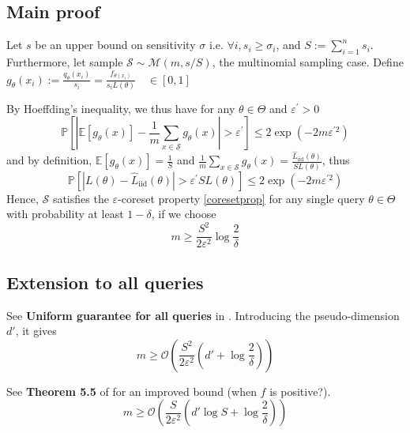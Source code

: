 \documentclass{article} %
\renewcommand{\epsilon}{\varepsilon}
\newcommand{\1}{\mathds{1}} %
\theoremstyle{definition} %
\begin{document}
\subsection{Main proof}
Let $s$ be an upper bound on sensitivity $\sigma$ i.e. $\forall i, s_i \geq \sigma_i$, and $S := \sum_{i=1}^n s_i$. Furthermore, let sample  $\mathcal S \sim \mathcal M(m, s/S)$, the multinomial sampling case. Define $g_\theta(x_i) := \frac{q_\theta(x_i)}{s_i} = \frac{f_{\theta(x_i)}}{s_i L(\theta)}  \quad \in[0,1]$

By Hoeffding's inequality, we thus have for any $\theta \in \Theta$ and $\varepsilon^{\prime}>0$
\begin{equation}
	\mathbb{P}\left[\left|\mathbb{E}\left[g_{\theta}(x)\right]-\frac{1}{m} \sum_{x \in \mathcal{S}} g_{\theta}(x)\right|>\varepsilon^{\prime}\right] \leq 2 \exp \left(-2 m \varepsilon^{\prime 2}\right)
\end{equation}
and by definition, $\mathbb{E}\left[g_{\theta}(x)\right]=\frac{1}{S}$ and $\frac{1}{m} \sum_{x \in \mathcal{S}} g_{\theta}(x)=\frac{\hat L_{\textrm{iid}}(\theta)}{S L(\theta)}$, thus
\begin{equation*}
	\mathbb{P}\left[|L(\theta)-\hat L_{\textrm{iid}}(\theta)|>\varepsilon^{\prime} S L(\theta)\right] \leq 2 \exp \left(-2 m \varepsilon^{\prime 2}\right)
\end{equation*}
Hence, $\mathcal{S}$ satisfies the $\epsilon$-coreset property \ref{coresetprop} for any single query $\theta \in \Theta$ with probability at least $1-\delta$, if we choose
\begin{equation*}
	m \geq \frac{S^{2}}{2 \varepsilon^{2}} \log \frac{2}{\delta}
\end{equation*}


\subsection{Extension to all queries}
See \textbf{Uniform guarantee for all queries} in \cite{bachem2017coresetML}. Introducing the pseudo-dimension $d'$, it gives
\begin{equation}
	m \geq \mathcal O(\frac{S^{2}}{2 \varepsilon^{2}} (d' + \log \frac{2}{\delta}))
\end{equation}

See \textbf{Theorem 5.5} of \cite{braverman2016coresetsota} for an improved bound (when $f$ is positive?).
\begin{equation}
	m \geq \mathcal O(\frac{S}{2 \varepsilon^{2}} (d' \log S + \log \frac{2}{\delta}))
\end{equation}
\end{document}
